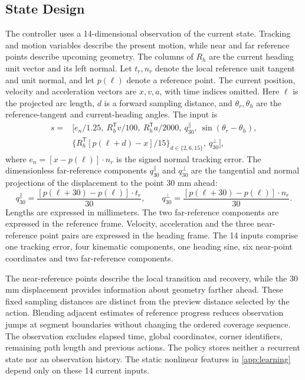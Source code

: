 \documentclass[preprint,12pt]{elsarticle}
\begin{document}
\subsection{State Design}
The controller uses a 14-dimensional observation of the current state. Tracking and motion variables describe the present motion, while near and far reference points describe upcoming geometry. The columns of $R_h$ are the current heading unit vector and its left normal. Let $t_r,n_r$ denote the local reference unit tangent and unit normal, and let $p(\ell)$ denote a reference point. The current position, velocity and acceleration vectors are $x,v,a$, with time indices omitted. Here $\ell$ is the projected arc length, $d$ is a forward sampling distance, and $\theta_r,\theta_h$ are the reference-tangent and current-heading angles. The input is
\begin{equation}
\begin{split}
s={}&[e_n/1.25,\ R_h^{\mathsf T}v/100,\ R_h^{\mathsf T}a/2000,\ q_{30}^{\parallel},\ \sin(\theta_r-\theta_h),\\
&\{R_h^{\mathsf T}[p(\ell+d)-x]/15\}_{d\in\{2,6,15\}},\ q_{30}^{\perp}],
\end{split}
\label{eq:state14}
\end{equation}
where $e_n=[x-p(\ell)]\cdot n_r$ is the signed normal tracking error. The dimensionless far-reference components $q_{30}^{\parallel}$ and $q_{30}^{\perp}$ are the tangential and normal projections of the displacement to the point 30 mm ahead:
\begin{equation}
q_{30}^{\parallel}=\frac{[p(\ell+30)-p(\ell)]\cdot t_r}{30},\qquad
q_{30}^{\perp}=\frac{[p(\ell+30)-p(\ell)]\cdot n_r}{30}.
\end{equation}
Lengths are expressed in millimeters. The two far-reference components are expressed in the reference frame. Velocity, acceleration and the three near-reference point pairs are expressed in the heading frame. The 14 inputs comprise one tracking error, four kinematic components, one heading sine, six near-point coordinates and two far-reference components.

The near-reference points describe the local transition and recovery, while the 30 mm displacement provides information about geometry farther ahead. These fixed sampling distances are distinct from the preview distance selected by the action. Blending adjacent estimates of reference progress reduces observation jumps at segment boundaries without changing the ordered coverage sequence. The observation excludes elapsed time, global coordinates, corner identifiers, remaining path length and previous actions. The policy stores neither a recurrent state nor an observation history. The static nonlinear features in \ref{app:learning} depend only on these 14 current inputs.
\end{document}
